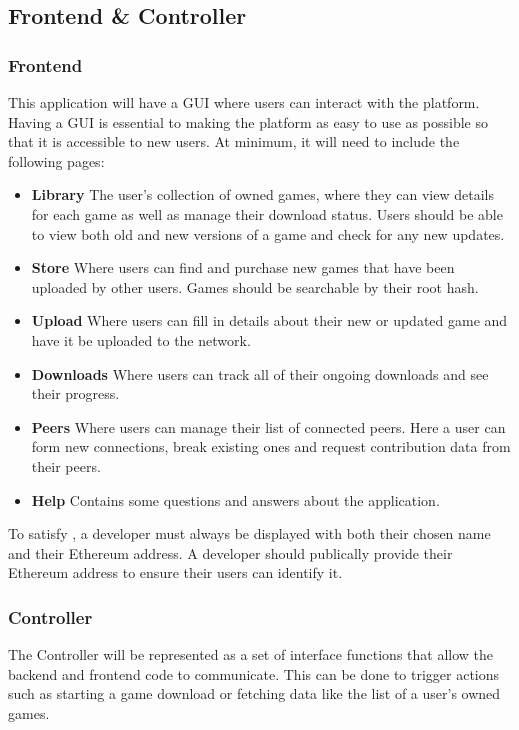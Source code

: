 \subsection{Frontend \& Controller}

\subsubsection{Frontend}\label{subsubsec:frontend}

This application will have a GUI   where users can interact with the platform. Having a GUI is essential to making the platform as easy to use as possible so that it is accessible to new users. At minimum, it will need to include the following pages:

\begin{itemize}
  \item \textbf{Library} The user's collection of owned games, where they can view details for each game as well as manage their download status. Users should be able to view both old and new versions of a game and check for any new updates.
  \item \textbf{Store} Where users can find and purchase new games that have been uploaded by other users. Games should be searchable by their root hash.
  \item \textbf{Upload} Where users can fill in details about their new or updated game and have it be uploaded to the network.
  \item \textbf{Downloads} Where users can track all of their ongoing downloads and see their progress.
  \item \textbf{Peers} Where users can manage their list of connected peers. Here a user can form new connections, break existing ones and request contribution data from their peers.
  \item \textbf{Help}  Contains some questions and answers about the application.
\end{itemize}

\newparagraph
To satisfy , a developer must always be displayed with both their chosen name and their Ethereum address. A developer should publically provide their Ethereum address to ensure their users can identify it.

\subsubsection{Controller}

The Controller will be represented as a set of interface functions that allow the backend and frontend code to communicate. This can be done to trigger actions such as starting a game download or fetching data like the list of a user's owned games.
